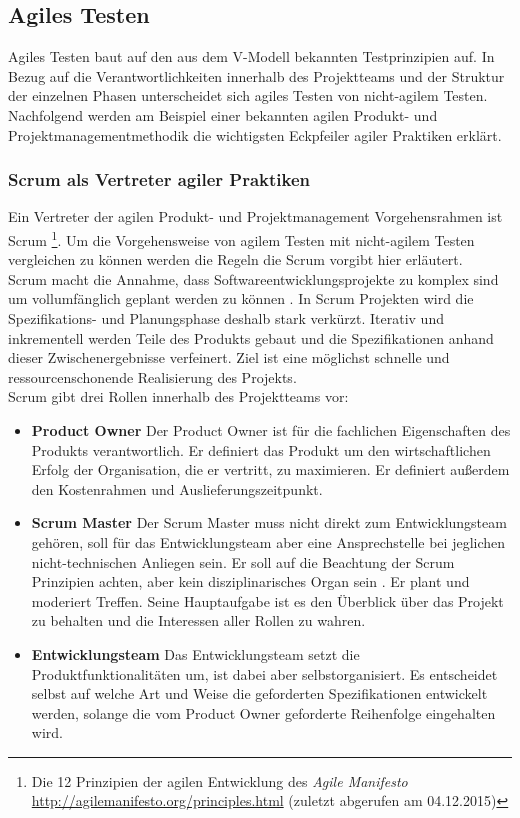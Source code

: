\subsection{Agiles Testen}
Agiles Testen baut auf den aus dem V-Modell bekannten Testprinzipien auf. In Bezug auf die Verantwortlichkeiten innerhalb des Projektteams und der Struktur der einzelnen Phasen unterscheidet sich agiles Testen von nicht-agilem Testen. Nachfolgend werden am Beispiel einer bekannten agilen Produkt- und Projektmanagementmethodik die wichtigsten Eckpfeiler agiler Praktiken erklärt.

\subsubsection{Scrum als Vertreter agiler Praktiken}
\label{sec:scrum}
Ein Vertreter der agilen Produkt- und Projektmanagement Vorgehensrahmen ist Scrum \footnote{Die 12 Prinzipien der agilen Entwicklung des \textit{Agile Manifesto} \url{http://agilemanifesto.org/principles.html} (zuletzt abgerufen am 04.12.2015)}. Um die Vorgehensweise von agilem Testen mit nicht-agilem Testen vergleichen zu können werden die Regeln die Scrum vorgibt hier erläutert.\\
Scrum macht die Annahme, dass Softwareentwicklungsprojekte zu komplex sind um vollumfänglich geplant werden zu können \cite{linz_testing_2014}. In Scrum Projekten wird die Spezifikations- und Planungsphase deshalb stark verkürzt. Iterativ und inkrementell werden Teile des Produkts gebaut und die Spezifikationen anhand dieser Zwischenergebnisse verfeinert. Ziel ist eine möglichst schnelle und ressourcenschonende Realisierung des Projekts.\\
Scrum gibt drei Rollen innerhalb des Projektteams vor:

\begin{itemize}
\item \textbf{Product Owner} Der Product Owner ist für die fachlichen Eigenschaften des Produkts verantwortlich. Er definiert das Produkt um den wirtschaftlichen Erfolg der Organisation, die er vertritt, zu maximieren. Er definiert außerdem den Kostenrahmen und Auslieferungszeitpunkt.
\item \textbf{Scrum Master} Der Scrum Master muss nicht direkt zum Entwicklungsteam gehören, soll für das Entwicklungsteam aber eine Ansprechstelle bei jeglichen nicht-technischen Anliegen sein. Er soll auf die Beachtung der Scrum Prinzipien achten, aber kein disziplinarisches Organ sein \cite{linz_testing_2014}. Er plant und moderiert Treffen. Seine Hauptaufgabe ist es den Überblick über das Projekt zu behalten und die Interessen aller Rollen zu wahren.
\item \textbf{Entwicklungsteam} Das Entwicklungsteam setzt die Produktfunktionalitäten um, ist dabei aber selbstorganisiert. Es entscheidet selbst auf welche Art und Weise die geforderten Spezifikationen entwickelt werden, solange die vom Product Owner geforderte Reihenfolge eingehalten wird.
\end{itemize}

